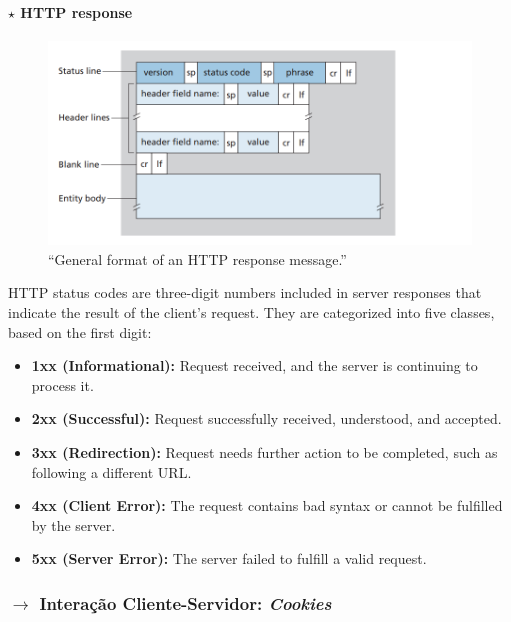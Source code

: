\clearpage
\paragraph[2.2.5.2 HTTP response]{$\pmb{\star}$ HTTP response}\mbox{}

\begin{figure}[H]
    \centering
    \includegraphics[width = 0.9\linewidth]{img/2/http-response-format.png}
    \caption{``General format of an HTTP response message.''\cite{Kurose2017}}
    \label{fig:http-response-format}
\end{figure}

\noindent HTTP status codes are three-digit numbers included in server responses that indicate the result of the client's request. They are categorized into five classes, based on the first digit:
\begin{itemize}
    \item \textbf{1xx (Informational):} Request received, and the server is continuing to process it.
    \item \textbf{2xx (Successful):} Request successfully received, understood, and accepted.
    \item \textbf{3xx (Redirection):} Request needs further action to be completed, such as following a different URL.
    \item \textbf{4xx (Client Error):} The request contains bad syntax or cannot be fulfilled by the server.
    \item \textbf{5xx (Server Error):} The server failed to fulfill a valid request.
\end{itemize}

\subsubsection[2.2.6 Interaç\~ao Cliente-Servidor: \textit{Cookies}]{$\pmb{\rightarrow}$ Interaç\~ao Cliente-Servidor: \textit{Cookies}}

